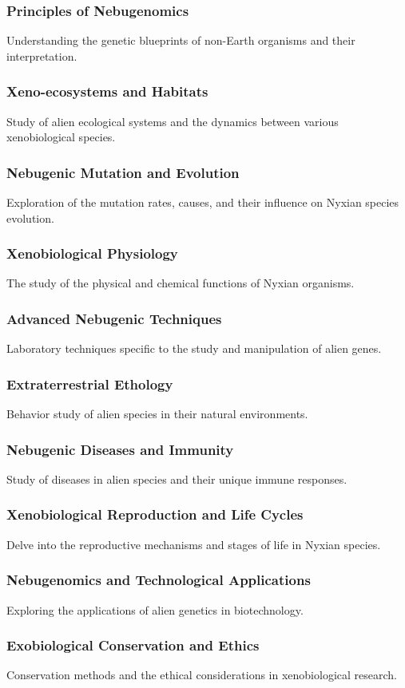 \subsubsection{Principles of Nebugenomics}
Understanding the genetic blueprints of non-Earth organisms and their interpretation.
\subsubsection{Xeno-ecosystems and Habitats}
Study of alien ecological systems and the dynamics between various xenobiological species.
\subsubsection{Nebugenic Mutation and Evolution}
Exploration of the mutation rates, causes, and their influence on Nyxian species evolution.
\subsubsection{Xenobiological Physiology}
The study of the physical and chemical functions of Nyxian organisms.
\subsubsection{Advanced Nebugenic Techniques}
Laboratory techniques specific to the study and manipulation of alien genes.
\subsubsection{Extraterrestrial Ethology}
Behavior study of alien species in their natural environments.
\subsubsection{Nebugenic Diseases and Immunity}
Study of diseases in alien species and their unique immune responses.
\subsubsection{Xenobiological Reproduction and Life Cycles}
Delve into the reproductive mechanisms and stages of life in Nyxian species.
\subsubsection{Nebugenomics and Technological Applications}
Exploring the applications of alien genetics in biotechnology.
\subsubsection{Exobiological Conservation and Ethics}
Conservation methods and the ethical considerations in xenobiological research.
